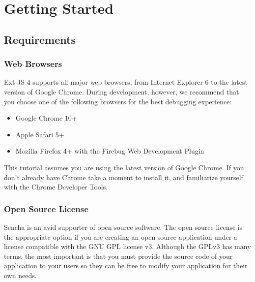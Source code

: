 \begin{titlepage}
	\maketitle
	\tableofcontents
\end{titlepage}

\pagebreak


\chapter{Getting Started}
\section{Requirements}

\subsection{Web Browsers}

\par Ext JS 4 supports all major web browsers, from Internet Explorer 6 to the latest version of Google Chrome. During development, however, we recommend that you choose one of the following browsers for the best debugging experience:
\begin{itemize}
\item Google Chrome 10+
\item Apple Safari 5+
\item Mozilla Firefox 4+ with the Firebug Web Development Plugin
\end{itemize}
\par This tutorial assumes you are using the latest version of Google Chrome. If you don't already have Chrome take a moment to install it, and familiarize yourself with the Chrome Developer Tools.\\

\subsection{Open Source License}
\par Sencha is an avid supporter of open source software. The open source license is the appropriate option if you are creating an open source application under a license compatible with the GNU GPL license v3. Although the GPLv3 has many terms, the most important is that you must provide the source code of your application to your users so they can be free to modify your application for their own needs.\\
